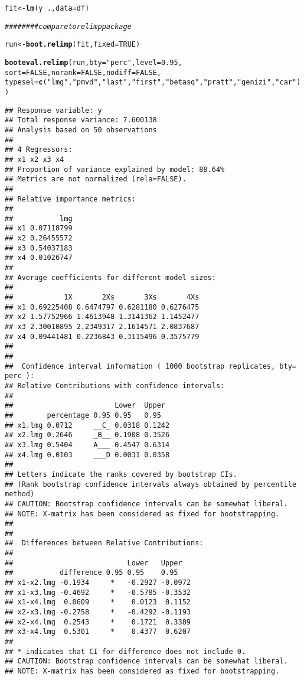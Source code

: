\documentclass[11pt,a4paper,twoside]{book}
\makeatletter
\newcommand{\hlnum}[1]{\textcolor[rgb]{0.686,0.059,0.569}{#1}}%
\newcommand{\hlstr}[1]{\textcolor[rgb]{0.192,0.494,0.8}{#1}}%
\newcommand{\hlcom}[1]{\textcolor[rgb]{0.678,0.584,0.686}{\textit{#1}}}%
\newcommand{\hlopt}[1]{\textcolor[rgb]{0,0,0}{#1}}%
\newcommand{\hlstd}[1]{\textcolor[rgb]{0.345,0.345,0.345}{#1}}%
\newcommand{\hlkwb}[1]{\textcolor[rgb]{0.69,0.353,0.396}{#1}}%
\newcommand{\hlkwc}[1]{\textcolor[rgb]{0.333,0.667,0.333}{#1}}%
\newcommand{\hlkwd}[1]{\textcolor[rgb]{0.737,0.353,0.396}{\textbf{#1}}}%
\newenvironment{kframe}{%
 \def\at@end@of@kframe{}%
 \ifinner\ifhmode%
  \def\at@end@of@kframe{\end{minipage}}%
  \begin{minipage}{\columnwidth}%
 \fi\fi%
 \def\FrameCommand##1{\hskip\@totalleftmargin \hskip-\fboxsep
 \colorbox{shadecolor}{##1}\hskip-\fboxsep
     \hskip-\linewidth \hskip-\@totalleftmargin \hskip\columnwidth}%
 \MakeFramed {\advance\hsize-\width
   \@totalleftmargin\z@ \linewidth\hsize
   \@setminipage}}%
 {\par\unskip\endMakeFramed%
 \at@end@of@kframe}
\newenvironment{knitrout}{}{} %
\makeatother
\begin{document}
\begin{knitrout}
\begin{kframe}
\begin{alltt}
\hlstd{fit} \hlkwb{<-} \hlkwd{lm}\hlstd{(y}\hlopt{~}\hlstd{.,} \hlkwc{data}\hlstd{=df)}

\hlcom{######## compare to relimp package}

\hlstd{run}\hlkwb{<-}\hlkwd{boot.relimp}\hlstd{(fit,} \hlkwc{fixed}\hlstd{=}\hlnum{TRUE}\hlstd{)}

\hlkwd{booteval.relimp}\hlstd{(run,} \hlkwc{bty} \hlstd{=} \hlstr{"perc"}\hlstd{,} \hlkwc{level} \hlstd{=} \hlnum{0.95}\hlstd{,}
                \hlkwc{sort} \hlstd{=} \hlnum{FALSE}\hlstd{,} \hlkwc{norank} \hlstd{=} \hlnum{FALSE}\hlstd{,} \hlkwc{nodiff} \hlstd{=} \hlnum{FALSE}\hlstd{,}
                \hlkwc{typesel} \hlstd{=} \hlkwd{c}\hlstd{(}\hlstr{"lmg"}\hlstd{,} \hlstr{"pmvd"}\hlstd{,} \hlstr{"last"}\hlstd{,} \hlstr{"first"}\hlstd{,} \hlstr{"betasq"}\hlstd{,} \hlstr{"pratt"}\hlstd{,} \hlstr{"genizi"}\hlstd{,} \hlstr{"car"}\hlstd{))}
\end{alltt}
\begin{verbatim}
## Response variable: y 
## Total response variance: 7.600138 
## Analysis based on 50 observations 
## 
## 4 Regressors: 
## x1 x2 x3 x4 
## Proportion of variance explained by model: 88.64%
## Metrics are not normalized (rela=FALSE). 
## 
## Relative importance metrics: 
## 
##           lmg
## x1 0.07118799
## x2 0.26455572
## x3 0.54037183
## x4 0.01026747
## 
## Average coefficients for different model sizes: 
## 
##            1X       2Xs       3Xs       4Xs
## x1 0.69225408 0.6474797 0.6281180 0.6276475
## x2 1.57752966 1.4613948 1.3141362 1.1452477
## x3 2.30010895 2.2349317 2.1614571 2.0837687
## x4 0.09441481 0.2236843 0.3115496 0.3575779
## 
##  
##  Confidence interval information ( 1000 bootstrap replicates, bty= perc ): 
## Relative Contributions with confidence intervals: 
##  
##                        Lower  Upper
##        percentage 0.95 0.95   0.95  
## x1.lmg 0.0712     __C_ 0.0318 0.1242
## x2.lmg 0.2646     _B__ 0.1908 0.3526
## x3.lmg 0.5404     A___ 0.4547 0.6314
## x4.lmg 0.0103     ___D 0.0031 0.0358
## 
## Letters indicate the ranks covered by bootstrap CIs. 
## (Rank bootstrap confidence intervals always obtained by percentile method) 
## CAUTION: Bootstrap confidence intervals can be somewhat liberal. 
## NOTE: X-matrix has been considered as fixed for bootstrapping. 
## 
##  
##  Differences between Relative Contributions: 
##  
##                           Lower   Upper
##           difference 0.95 0.95    0.95   
## x1-x2.lmg -0.1934     *   -0.2927 -0.0972
## x1-x3.lmg -0.4692     *   -0.5785 -0.3532
## x1-x4.lmg  0.0609     *    0.0123  0.1152
## x2-x3.lmg -0.2758     *   -0.4292 -0.1193
## x2-x4.lmg  0.2543     *    0.1721  0.3389
## x3-x4.lmg  0.5301     *    0.4377  0.6207
## 
## * indicates that CI for difference does not include 0. 
## CAUTION: Bootstrap confidence intervals can be somewhat liberal. 
## NOTE: X-matrix has been considered as fixed for bootstrapping.
\end{verbatim}
\end{kframe}
\end{knitrout}
\end{document}
